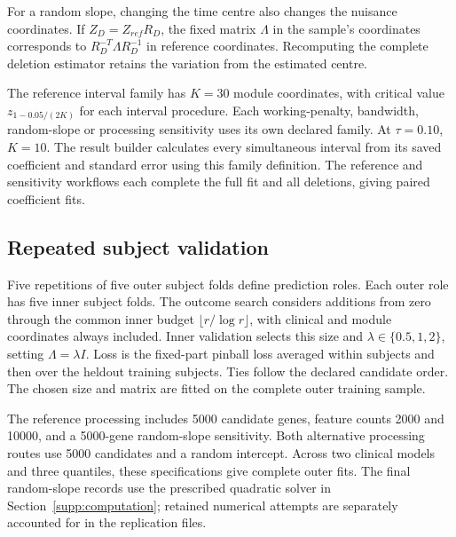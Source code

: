 For a random slope, changing the time centre also changes the
nuisance coordinates. If $Z_D=Z_{ref}R_D$, the fixed matrix
$\Lambda$ in the sample's coordinates corresponds to
$R_D^{-T}\Lambda R_D^{-1}$ in reference coordinates. Recomputing
the complete deletion estimator retains the variation from the
estimated centre.

The reference interval family has $K=30$ module coordinates, with
critical value $z_{1-0.05/(2K)}$ for each interval procedure. Each
working-penalty, bandwidth, random-slope or processing sensitivity
uses its own declared family. At $\tau=0.10$, $K=10$.
The result builder calculates every simultaneous interval from its
saved coefficient and standard error using this family definition.
The \JointModuleWorkflows{} reference and sensitivity workflows
each complete the full fit and all \SLEEligibleSubjects{} deletions,
giving \JointModulePairedFits{} paired coefficient fits.

\begingroup\small


\endgroup


\subsection{Repeated subject validation}

Five repetitions of five outer subject folds define prediction
roles. Each outer role has five inner subject folds. The outcome
search considers additions from zero through the common inner
budget $\lfloor r/\log r\rfloor$, with clinical and module
coordinates always included. Inner validation selects this size
and $\lambda\in\{0.5,1,2\}$, setting $\Lambda=\lambda I$.
Loss is the fixed-part pinball loss averaged within subjects and
then over the heldout training subjects. Ties follow the declared
candidate order. The chosen size and matrix are fitted on the
complete outer training sample.

The reference processing includes 5000 candidate genes, feature
counts 2000 and 10000, and a 5000-gene random-slope sensitivity.
Both alternative processing routes use 5000 candidates and a
random intercept. Across two clinical models and three quantiles,
these specifications give \JointPredictionFits{} complete outer
fits. The final random-slope records use the prescribed quadratic
solver in Section~\ref{supp:computation}; retained numerical
attempts are separately accounted for in the replication files.

